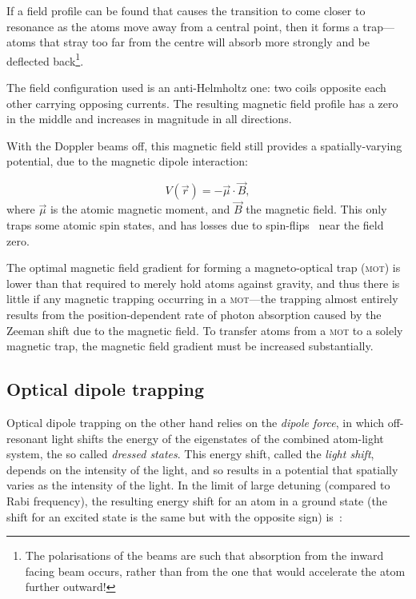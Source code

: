 If a field profile can be found that causes the transition to come closer to resonance as the atoms move away from a central point, then it forms a trap---atoms  that stray too far from the centre will absorb more strongly and be deflected back\footnote{The polarisations of the beams are such that absorption from the inward facing beam occurs, rather than from the one that would accelerate the atom further outward!}.

The field configuration used is an anti-Helmholtz one: two coils opposite each other carrying opposing currents. The resulting magnetic field profile has a zero in the middle and increases in magnitude in all directions.

With the Doppler beams off, this magnetic field still provides a spatially-varying potential, due to the magnetic dipole interaction:

\begin{equation}
V(\vec{r}) = -\vec \mu \cdot \vec B,
\end{equation}
where $\vec\mu$ is the atomic magnetic moment, and $\vec B$ the magnetic field. This only traps some atomic spin states, and has losses due to spin-flips~\cite{brink_majorana_2006} near the field zero.

The optimal magnetic field gradient for forming a magneto-optical trap (\textsc{mot}) is lower than that required to merely hold atoms against gravity, and thus there is little if any magnetic trapping occurring in a \textsc{mot}---the trapping almost entirely results from the position-dependent rate of photon absorption caused by the Zeeman shift due to the magnetic field. To transfer atoms from a \textsc{mot} to a solely magnetic trap, the magnetic field gradient must be increased substantially.

\subsection{Optical dipole trapping}

Optical dipole trapping on the other hand relies on the \emph{dipole force}, in which off-resonant light shifts the energy of the eigenstates of the combined atom-light system, the so called \emph{dressed states}. This energy shift, called the \emph{light shift}, depends on the intensity of the light, and so results in a potential that spatially varies as the intensity of the light. In the limit of large detuning (compared to Rabi frequency), the resulting energy shift for an atom in a ground state (the shift for an excited state is the same but with the opposite sign) is~\cite[p 8]{metcalf_laser_1999}:

